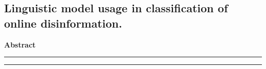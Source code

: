 \documentclass[a4paper,12pt]{article}
\begin{document}


\begin{large}

\begin{center}
\section*{Linguistic model usage in classification of online disinformation.}
\end{center}

\medskip

\begin{center}
\textbf{Abstract}
\end{center}


\hrule height 1pt
\vskip 3pt \hrule

\medskip
\medskip






\end{large}
\end{document}
